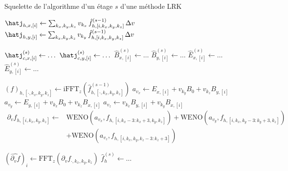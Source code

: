 \begin{algorithm}
  \caption{Squelette de l'algorithme d'un étage $s$ d'une méthode LRK}
  \label{alg:squeltte}
  \begin{algorithmic}[1]
     \label{alg:l:0}

      \State $\hatj_{h,x,[i]} \gets \sum_{k_x,k_y,k_z} v_{k_x}\,\hat{f}_{h,[i,k_x,k_y,k_z]}^{(s-1)}\,\Delta v$ \label{alg:l:jhx}
      \State $\hatj_{h,y,[i]} \gets \sum_{k_x,k_y,k_z} v_{k_y}\,\hat{f}_{h,[i,k_x,k_y,k_z]}^{(s-1)}\,\Delta v$ \label{alg:l:jhy}
    \EndFor

      \State $\hatj_{c,x,[i]}^{(s)} \gets \dots$ \label{alg:l:sp0}
      \State $\hatj_{c,y,[i]}^{(s)} \gets \dots$
      \State $\hat{B}_{x,[i]}^{(s)} \gets \dots$
      \State $\hat{B}_{y,[i]}^{(s)} \gets \dots$
      \State $\hat{E}_{x,[i]}^{(s)} \gets \dots$
      \State $\hat{E}_{y,[i]}^{(s)} \gets \dots$ \label{alg:l:sp5}
    \EndFor \label{alg:l:14}

     \label{alg:l:15}

    \State $\left(f\right)_{h,[\cdot,k_x,k_y,k_z]} \gets \textrm{iFFT}_z\left( \hat{f}^{(s-1)}_{h,[\cdot,k_x,k_y,k_z]} \right)$
        \State $a_{v_x} \gets E_{x,[i]} + v_{k_y}B_0 + v_{k_z}B_{y,[i]}$ \label{alg:l:avx}
        \State $a_{v_y} \gets E_{y,[i]} + v_{k_x}B_0 + v_{k_z}B_{x,[i]}$ \label{alg:l:avy}
        \State $a_{v_z} \gets v_{k_x}B_{y,[i]} + v_{k_y}B_{x,[i]}$       \label{alg:l:avz}
        \State $\begin{aligned}\partial_vf_{h,[i,k_x,k_y,k_z]} \gets &\text{WENO}(a_{v_x},f_{h,[i,k_x-3:k_x+3,k_y,k_z]})+\text{WENO}(a_{v_y},f_{h,[i,k_x,k_y-3:k_y+3,k_z]})\\
       &+ \text{WENO}(a_{v_z},f_{h,[i,k_x,k_y,k_z-3:k_z+3]})\end{aligned}$
      \EndFor
    \EndFor

      \State $\left(\widehat{\partial_vf}\right)_i \gets \text{FFT}_z(\partial_vf_{\cdot,k_x,k_y,k_z})$
        \State $\hat{f}_h^{(s)} \gets \dots$  \label{alg:l:sp6}
      \EndFor
    \EndFor \label{alg:l:29}
  \end{algorithmic}
\end{algorithm}

